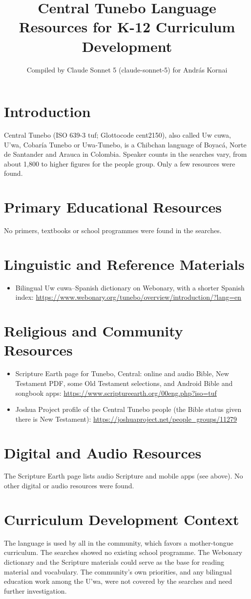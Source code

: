 \documentclass[12pt]{article}
\title{Central Tunebo Language Resources for K-12 Curriculum Development}
\author{Compiled by Claude Sonnet 5 (claude-sonnet-5) for Andr\'as Kornai}
\date{}
\begin{document}
\maketitle

\section{Introduction}
Central Tunebo (ISO 639-3 tuf; Glottocode cent2150), also called Uw cuwa, U'wa, Cobaría Tunebo or Uwa-Tunebo, is a Chibchan language of Boyacá, Norte de Santander and Arauca in Colombia. Speaker counts in the searches vary, from about 1,800 to higher figures for the people group. Only a few resources were found.

\section{Primary Educational Resources}
No primers, textbooks or school programmes were found in the searches.

\section{Linguistic and Reference Materials}
\begin{itemize}
\item Bilingual Uw cuwa--Spanish dictionary on Webonary, with a shorter Spanish index: \url{https://www.webonary.org/tunebo/overview/introduction/?lang=en}
\end{itemize}

\section{Religious and Community Resources}
\begin{itemize}
\item Scripture Earth page for Tunebo, Central: online and audio Bible, New Testament PDF, some Old Testament selections, and Android Bible and songbook apps: \url{https://www.scriptureearth.org/00eng.php?iso=tuf}
\item Joshua Project profile of the Central Tunebo people (the Bible status given there is New Testament): \url{https://joshuaproject.net/people_groups/11279}
\end{itemize}

\section{Digital and Audio Resources}
The Scripture Earth page lists audio Scripture and mobile apps (see above). No other digital or audio resources were found.

\section{Curriculum Development Context}
The language is used by all in the community, which favors a mother-tongue curriculum. The searches showed no existing school programme. The Webonary dictionary and the Scripture materials could serve as the base for reading material and vocabulary. The community's own priorities, and any bilingual education work among the U'wa, were not covered by the searches and need further investigation.
\end{document}
